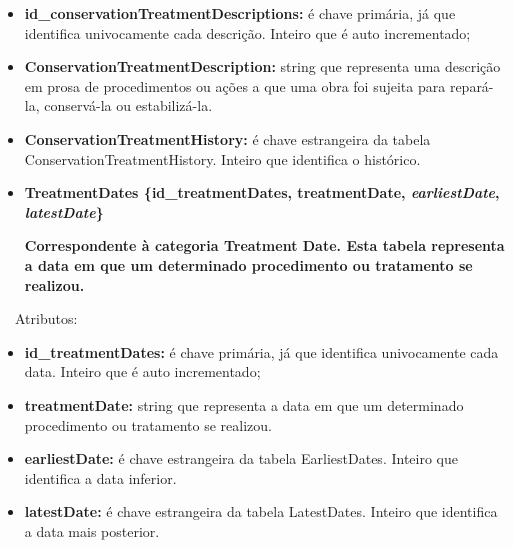 \documentclass[letterpaper]{article}
\newcommand\textstyleStrongEmphasis[1]{\textbf{#1}}
\newcommand\liststyleLi{%
\renewcommand\labelitemi{{\textbullet}}
\renewcommand\labelitemii{[27A2?]}
\renewcommand\labelitemiii{{\textbullet}}
\renewcommand\labelitemiv{{\textbullet}}
}
\newcommand\liststyleLx{%
\renewcommand\labelitemi{[27A2?]}
\renewcommand\labelitemii{[27A2?]}
\renewcommand\labelitemiii{[27A2?]}
\renewcommand\labelitemiv{[27A2?]}
}
\newcommand\liststyleLxi{%
\renewcommand\labelitemi{[27A2?]}
\renewcommand\labelitemii{[27A2?]}
\renewcommand\labelitemiii{[27A2?]}
\renewcommand\labelitemiv{[27A2?]}
}
\begin{document}
\liststyleLx
\begin{itemize}
\item {
\textbf{id\_conservationTreatmentDescriptions:} \'e chave prim\'aria,
j\'a que identifica univocamente cada descri\c{c}\~ao. Inteiro que \'e
auto incrementado;}
\item {
\textbf{ConservationTreatmentDescription: }string que representa uma
descri\c{c}\~ao em prosa de procedimentos ou a\c{c}\~oes a que uma obra
foi sujeita para repar\'a-la, conserv\'a-la ou estabiliz\'a-la. }
\item {
\textbf{ConservationTreatmentHistory:}\textit{ }\'e chave estrangeira da
tabela ConservationTreatmentHistory. Inteiro que identifica o
hist\'orico.}


\bigskip
\end{itemize}
\liststyleLi
\begin{itemize}
\item {\bfseries
TreatmentDates\textmd{ \{}\textmd{id\_treatmentDates}\textmd{,
treatmentDate, }\textmd{\textit{earliestDate}}\textmd{,
}\textmd{\textit{latestDate}}\textmd{\}}}

{\bfseries
\foreignlanguage{english}{\textmd{Correspondente \`a categoria
}}\textstyleStrongEmphasis{\foreignlanguage{english}{Treatment
Date}}\foreignlanguage{english}{\textmd{. Esta
}}\textstyleStrongEmphasis{\foreignlanguage{english}{\textmd{tabela}}}\foreignlanguage{english}{\textmd{
representa a data em que um determinado procedimento ou tratamento se
realizou.}}}
\end{itemize}

\bigskip

{
\ \ Atributos:}

\liststyleLxi
\begin{itemize}
\item {
\textbf{id\_treatmentDates:} \'e chave prim\'aria, j\'a que identifica
univocamente cada data. Inteiro que \'e auto incrementado;}
\item {
\textbf{treatmentDate: }string que representa a data em que um
determinado procedimento ou tratamento se realizou.}
\item {
\textbf{earliestDate:} \'e chave estrangeira da tabela EarliestDates.
Inteiro que identifica a data inferior.}
\item {
\textbf{latestDate:} \'e chave estrangeira da tabela LatestDates.
Inteiro que identifica a data mais posterior.}
\end{itemize}
\end{document}

